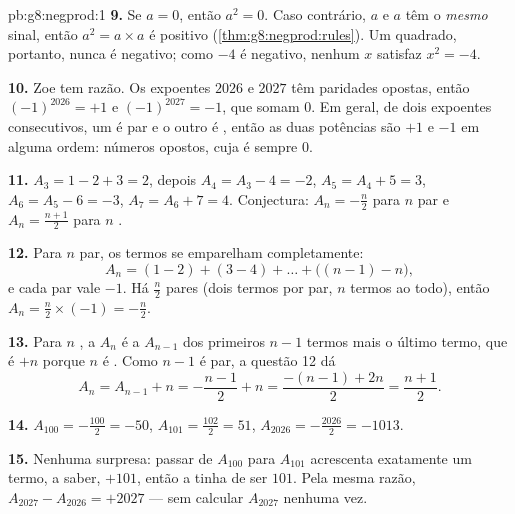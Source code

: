 \begin{solution}{pb:g8:negprod:1}
\textbf{9.} Se $a = 0$, então $a^2 = 0$. Caso contrário, $a$ e $a$ têm
o \emph{mesmo} sinal, então $a^2 = a \times a$ é positivo
(\cref{thm:g8:negprod:rules}). Um quadrado, portanto, nunca é
negativo; como $-4$ é negativo, nenhum  $x$ satisfaz
$x^2 = -4$.

\textbf{10.} Zoe tem razão. Os expoentes $2026$ e $2027$ têm paridades
opostas, então $(-1)^{2026} = +1$ e $(-1)^{2027} = -1$, que somam $0$.
Em geral, de dois expoentes consecutivos, um é par e o outro é ,
então as duas potências são $+1$ e $-1$ em alguma ordem: números
opostos, cuja  é sempre $0$.

\textbf{11.} $A_3 = 1 - 2 + 3 = 2$, depois $A_4 = A_3 - 4 = -2$,
$A_5 = A_4 + 5 = 3$, $A_6 = A_5 - 6 = -3$, $A_7 = A_6 + 7 = 4$.
Conjectura: $A_n = -\frac{n}{2}$ para $n$ par e
$A_n = \frac{n+1}{2}$ para $n$ .

\textbf{12.} Para $n$ par, os termos se emparelham completamente:
\[
A_n = (1 - 2) + (3 - 4) + \dots + \bigl((n-1) - n\bigr),
\]
e cada par vale $-1$. Há $\frac{n}{2}$ pares (dois termos por par, $n$
termos ao todo), então $A_n = \frac{n}{2} \times (-1) = -\frac{n}{2}$.

\textbf{13.} Para $n$ , a  $A_n$ é a  $A_{n-1}$ dos
primeiros $n - 1$ termos mais o último termo, que é $+n$ porque $n$ é
. Como $n - 1$ é par, a questão 12 dá
\[
A_n = A_{n-1} + n = -\frac{n-1}{2} + n
= \frac{-(n-1) + 2n}{2} = \frac{n+1}{2} .
\]

\textbf{14.} $A_{100} = -\frac{100}{2} = -50$, \quad
$A_{101} = \frac{102}{2} = 51$, \quad
$A_{2026} = -\frac{2026}{2} = -1013$.

\textbf{15.} Nenhuma surpresa: passar de $A_{100}$ para $A_{101}$
acrescenta exatamente um termo, a saber, $+101$, então a 
tinha de ser $101$. Pela mesma razão,
$A_{2027} - A_{2026} = +2027$ --- sem calcular $A_{2027}$ nenhuma
vez.
\end{solution}
